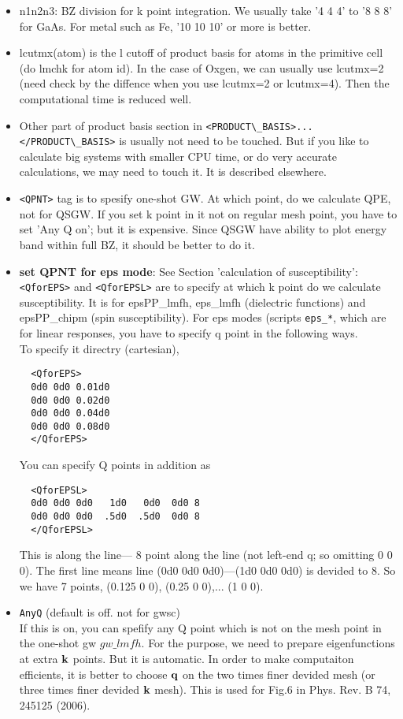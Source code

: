 \documentclass[a4paper,10pt,epsf,fleqn]{article}
\begin{document}
\begin{itemize}
\item
  n1n2n3: BZ division for k point integration. 
     We usually take '4 4 4' to '8 8 8' for GaAs. For metal such
     as Fe, '10 10 10' or more is better.
\item
     lcutmx(atom) is the l cutoff of product basis for atoms 
     in the primitive cell (do lmchk for atom id).
     In the case of Oxgen, we can usually use lcutmx=2 (need check by
     the diffence when you use lcutmx=2 or lcutmx=4). 
     Then the computational time is reduced well.
\item
     Other part of product basis section in \verb+<PRODUCT\_BASIS>... </PRODUCT\_BASIS>+
     is usually not need to be touched. But if you
     like to calculate big systems with smaller CPU time,
     or do very accurate calculations, we may need to touch it.  
     It is described elsewhere.
\item
    \verb+<QPNT>+ tag is to spesify one-shot GW. At which point, do we
    calculate QPE, not for QSGW. If you set k point in it not on regular mesh point,
    you have to set 'Any Q on'; but it is expensive.
    Since QSGW have ability to plot energy band within full BZ,
    it should be better to do it.
\item
   {\bf set QPNT for eps mode}: See Section 'calculation of susceptibility':
   \verb+<QforEPS>+ and \verb+<QforEPSL>+ are to specify at which k point do we
   calculate susceptibility. It is for epsPP\_lmfh, eps\_lmfh
   (dielectric functions) and epsPP\_chipm (spin susceptibility).
   For eps modes (scripts \verb#eps_*#, which are for linear responses,
   you have to specify q point in the following ways.\\

  To specify it directry (cartesian),
  \begin{verbatim}
  <QforEPS>
  0d0 0d0 0.01d0
  0d0 0d0 0.02d0
  0d0 0d0 0.04d0
  0d0 0d0 0.08d0
  </QforEPS>
  \end{verbatim}
  You can specify Q points in addition as 
  \begin{verbatim}
  <QforEPSL>
  0d0 0d0 0d0   1d0   0d0  0d0 8
  0d0 0d0 0d0  .5d0  .5d0  0d0 8
  </QforEPSL>
  \end{verbatim}
  This is along the line--- 8 point along the line (not left-end q; so omitting 0 0 0).
  The first line means line (0d0 0d0 0d0)---(1d0 0d0 0d0) is devided to 8. 
  So we have 7 points, (0.125 0 0), (0.25 0 0),... (1 0 0).

\item \verb+AnyQ+ (default is off. not for gwsc)\\
If this is on, you can spefify any Q point which is not on the mesh
point in the one-shot gw $gw\_lmfh$.
For the purpose, we need to prepare eigenfunctions at extra $\bf k$ points.
But it is automatic. In order to make computaiton efficients, it is better to choose
${\bf q}$ on the two times finer devided mesh (or three times finer devided ${\bf k}$ mesh).
This is used for Fig.6 in Phys. Rev. B 74, 245125 (2006).
\end{itemize}
\end{document}
